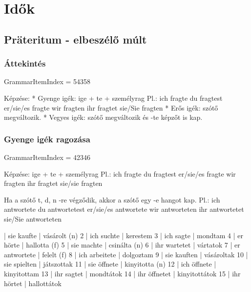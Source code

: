\documentclass{article}
\newenvironment{desc}{\verbatim}{\endverbatim}
\newenvironment{exmp}{\verbatim}{\endverbatim}
\begin{document}
\section{Idők}

\subsection{Präteritum - elbeszélő múlt}

\subsubsection{Áttekintés}

GrammarItemIndex = 54358

\begin{desc}
Képzése:
* Gyenge igék: ige + te + személyrag
  Pl.: ich fragte 
       du fragtest 
       er/sie/es fragte 
       wir fragten 
       ihr fragtet 
       sie/Sie fragten
* Erős igék: szótő megváltozik.
* Vegyes igék: szótő megváltozik és -te képzőt is kap.
\end{desc}

\begin{exmp}
\end{exmp}

\subsubsection{Gyenge igék ragozása}

GrammarItemIndex = 42346

\begin{desc}
Képzése: ige + te + személyrag
Pl.:
ich fragte
du fragtest
er/sie/es fragte
wir fragten
ihr fragtet
sie/sie fragten

Ha a szótő t, d, n -re végződik, akkor a szótő egy -e hangot kap.
Pl.:
ich antwortete
du antwortetest
er/sie/es antwortete
wir antworteten
ihr antwortetet
sie/Sie antworteten
\end{desc}

\begin{exmp}
1 | sie kaufte | vásárolt (n)
2 | ich suchte | kerestem
3 | ich sagte | mondtam
4 | er hörte | hallotta (f)
5 | sie machte | csinálta (n)
6 | ihr wartetet | vártatok
7 | er antwortete | felelt (f)
8 | ich arbeitete | dolgoztam
9 | sie kauften | vásároltak
10 | sie spielten | játszottak
11 | sie öffnete | kinyitotta (n)
12 | ich öffnete | kinyitottam
13 | ihr sagtet | mondtátok
14 | ihr öffnetet | kinyitottátok
15 | ihr hörtet | hallottátok
\end{exmp}
\end{document}
